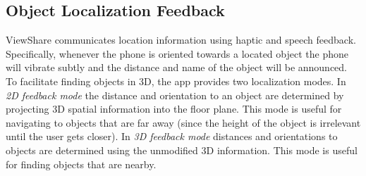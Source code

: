 \documentclass[chi_draft]{sigchi}
\begin{document}
\subsection{Object Localization Feedback}
ViewShare communicates location information using haptic and speech feedback.  Specifically, whenever the phone is oriented towards a located object the phone will vibrate subtly and the distance and name of the object will be announced.  To facilitate finding objects in 3D, the app provides two localization modes.  In \emph{2D feedback mode} the distance and orientation to an object are determined by projecting 3D spatial information into the floor plane.  This mode is useful for navigating to objects that are far away (since the height of the object is irrelevant until the user gets closer).  In \emph{3D feedback mode} distances and orientations to objects are determined using the unmodified 3D information.  This mode is useful for finding objects that are nearby.%
\end{document}
